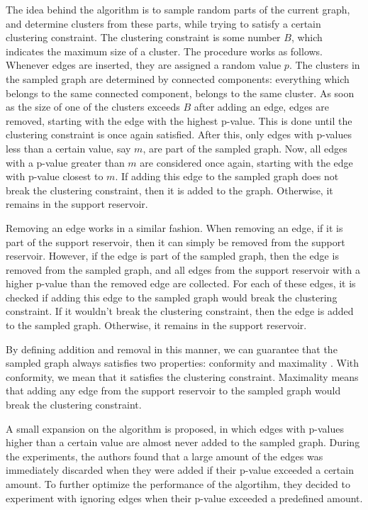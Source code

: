 \documentclass[a4paper]{article}
\begin{document}
The idea behind the algorithm is to sample random parts of the current graph, and determine clusters from these parts, while trying to satisfy a certain clustering constraint. The clustering constraint is some number $B$, which indicates the maximum size of a cluster. The procedure works as follows. Whenever edges are inserted, they are assigned a random value $p$. The clusters in the sampled graph are determined by connected components: everything which belongs to the same connected component, belongs to the same cluster. As soon as the size of one of the clusters exceeds $B$ after adding an edge, edges are removed, starting with the edge with the highest p-value. This is done until the clustering constraint is once again satisfied. After this, only edges with p-values less than a certain value, say $m$, are part of the sampled graph. Now, all edges with a p-value greater than $m$ are considered once again, starting with the edge with p-value closest to $m$. If adding this edge to the sampled graph does not break the clustering constraint, then it is added to the graph. Otherwise, it remains in the support reservoir. 

Removing an edge works in a similar fashion. When removing an edge, if it is part of the support reservoir, then it can simply be removed from the support reservoir. However, if the edge is part of the sampled graph, then the edge is removed from the sampled graph, and all edges from the support reservoir with a higher p-value than the removed edge are collected. For each of these edges, it is checked if adding this edge to the sampled graph would break the clustering constraint. If it wouldn't break the clustering constraint, then the edge is added to the sampled graph. Otherwise, it remains in the support reservoir.

By defining addition and removal in this manner, we can guarantee that the sampled graph always satisfies two properties: conformity and maximality . With conformity, we mean that it satisfies the clustering constraint. Maximality means that adding any edge from the support reservoir to the sampled graph would break the clustering constraint. 

A small expansion on the algorithm is proposed, in which edges with p-values higher than a certain value are almost never added to the sampled graph. During the experiments, the authors found that a large amount of the edges was immediately discarded when they were added if their p-value exceeded a certain amount. To further optimize the performance of the algortihm, they decided to experiment with ignoring edges when their p-value exceeded a predefined amount.
\end{document}
